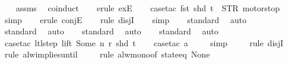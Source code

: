 \begin{isabellebody}
\isadelimproof
\ \ %
\endisadelimproof
%
\isatagproof
{}\isamarkupfalse%
\ assms\ \isamarkupfalse%
\ coinduct\isanewline
\ \ \isamarkupfalse%
\ {\isacharparenleft}erule\ exE{\isacharparenright}{\isacharplus}\isanewline
\ \ \isamarkupfalse%
\ {\isacharparenleft}case{\isacharunderscore}tac\ {\isachardoublequoteopen}fst\ {\isacharparenleft}shd\ t{\isacharparenright}\ {\isacharequal}\ STR\ {\isacharprime}{\isacharprime}motorstop{\isacharprime}{\isacharprime}{\isachardoublequoteclose}{\isacharparenright}\isanewline
\ \ \ \isamarkupfalse%
\ simp\isanewline
\ \ \isamarkupfalse%
\ {\isacharparenleft}erule\ conjE{\isacharparenright}\isanewline
\ \ \isamarkupfalse%
\ {\isacharparenleft}rule\ disjI{}{\isacharparenright}\isanewline
\ \ \isamarkupfalse%
\ simp\isanewline
\ \ \isamarkupfalse%
\ standard\ \isamarkupfalse%
\ auto{\isacharbrackleft}{}{\isacharbrackright}\isanewline
\ \ \isamarkupfalse%
\ standard\ \isamarkupfalse%
\ auto{\isacharbrackleft}{}{\isacharbrackright}\isanewline
\ \ \isamarkupfalse%
\ standard\ \isamarkupfalse%
\ auto{\isacharbrackleft}{}{\isacharbrackright}\isanewline
\ \ \isamarkupfalse%
\ standard\ \isamarkupfalse%
\ auto{\isacharbrackleft}{}{\isacharbrackright}\isanewline
\ \ \isamarkupfalse%
\ {\isacharparenleft}case{\isacharunderscore}tac\ {\isachardoublequoteopen}ltl{\isacharunderscore}step\ lift\ {\isacharparenleft}Some\ n{\isacharparenright}\ r\ {\isacharparenleft}shd\ t{\isacharparenright}{\isachardoublequoteclose}{\isacharparenright}\isanewline
\ \ \isamarkupfalse%
\ {\isacharparenleft}case{\isacharunderscore}tac\ a{\isacharparenright}\isanewline
\ \ \ \isamarkupfalse%
\ simp\isanewline
\ \ \ \isamarkupfalse%
\ {\isacharparenleft}rule\ disjI{}{\isacharparenright}\isanewline
\ \ \ \isamarkupfalse%
\ {\isacharparenleft}rule\ alw{\isacharunderscore}implies{\isacharunderscore}until{\isacharparenright}\isanewline
\ \ \ \isamarkupfalse%
\ {\isacharparenleft}rule\ alw{\isacharunderscore}mono{\isacharbrackleft}of\ {\isachardoublequoteopen}state{\isacharunderscore}eq\ None{\isachardoublequoteclose}{\isacharbrackright}{\isacharparenright}\isanewline
\ \ \isamarkupfalse%

\end{isabellebody}

